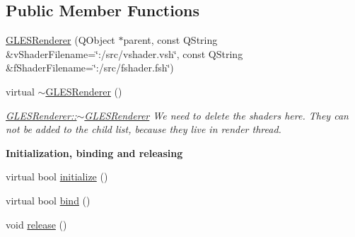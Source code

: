 \subsection*{Public Member Functions}
\begin{DoxyCompactItemize}
\item 
\mbox{\hyperlink{class_g_l_e_s_renderer_a0c5bf4702ee731dde0377a08b5e15ae2}{G\+L\+E\+S\+Renderer}} (Q\+Object $\ast$parent, const Q\+String \&v\+Shader\+Filename=\char`\"{}\+:/src/vshader.\+vsh\char`\"{}, const Q\+String \&f\+Shader\+Filename=\char`\"{}\+:/src/fshader.\+fsh\char`\"{})
\item 
virtual \mbox{\hyperlink{class_g_l_e_s_renderer_aa828ddb16aa0f76409d24369735baa63}{$\sim$\+G\+L\+E\+S\+Renderer}} ()
\begin{DoxyCompactList}\small\item\em \mbox{\hyperlink{class_g_l_e_s_renderer_aa828ddb16aa0f76409d24369735baa63}{G\+L\+E\+S\+Renderer\+::$\sim$\+G\+L\+E\+S\+Renderer}} We need to delete the shaders here. They can not be added to the child list, because they live in render thread. \end{DoxyCompactList}\end{DoxyCompactItemize}
\begin{Indent}\textbf{ Initialization, binding and releasing}\par
\begin{DoxyCompactItemize}
\item 
virtual bool \mbox{\hyperlink{class_g_l_e_s_renderer_a0bb1617bc39236ccbf430cd282f127f2}{initialize}} ()
\item 
virtual bool \mbox{\hyperlink{class_g_l_e_s_renderer_a41d040c7fa439552abf339b3883b02f4}{bind}} ()
\item 
void \mbox{\hyperlink{class_g_l_e_s_renderer_a860d9102e98cd4394dc91c56e61c512b}{release}} ()
\end{DoxyCompactItemize}
\end{Indent}

